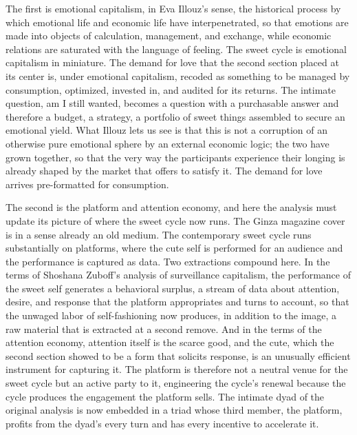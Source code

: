 The first is emotional capitalism, in Eva Illouz's sense, the historical process by which emotional life and economic life have interpenetrated, so that emotions are made into objects of calculation, management, and exchange, while economic relations are saturated with the language of feeling. The sweet cycle is emotional capitalism in miniature. The demand for love that the second section placed at its center is, under emotional capitalism, recoded as something to be managed by consumption, optimized, invested in, and audited for its returns. The intimate question, am I still wanted, becomes a question with a purchasable answer and therefore a budget, a strategy, a portfolio of sweet things assembled to secure an emotional yield. What Illouz lets us see is that this is not a corruption of an otherwise pure emotional sphere by an external economic logic; the two have grown together, so that the very way the participants experience their longing is already shaped by the market that offers to satisfy it. The demand for love arrives pre-formatted for consumption.

The second is the platform and attention economy, and here the analysis must update its picture of where the sweet cycle now runs. The Ginza magazine cover is in a sense already an old medium. The contemporary sweet cycle runs substantially on platforms, where the cute self is performed for an audience and the performance is captured as data. Two extractions compound here. In the terms of Shoshana Zuboff's analysis of surveillance capitalism, the performance of the sweet self generates a behavioral surplus, a stream of data about attention, desire, and response that the platform appropriates and turns to account, so that the unwaged labor of self-fashioning now produces, in addition to the image, a raw material that is extracted at a second remove. And in the terms of the attention economy, attention itself is the scarce good, and the cute, which the second section showed to be a form that solicits response, is an unusually efficient instrument for capturing it. The platform is therefore not a neutral venue for the sweet cycle but an active party to it, engineering the cycle's renewal because the cycle produces the engagement the platform sells. The intimate dyad of the original analysis is now embedded in a triad whose third member, the platform, profits from the dyad's every turn and has every incentive to accelerate it.

